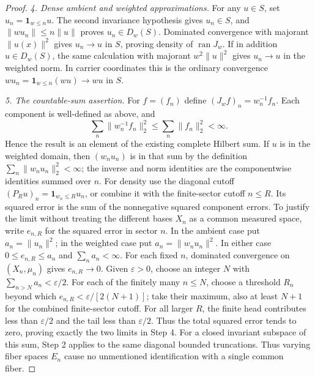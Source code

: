 \documentclass[11pt,a4paper]{article}
\theoremstyle{definition}
\theoremstyle{remark}
\begin{document}
\begin{proof}
\emph{4. Dense ambient and weighted approximations.}
For any $u\in S$, set $u_n=\mathbf1_{w\leq n}u$. The second
invariance hypothesis gives $u_n\in S$, and
$\|wu_n\|\leq n\|u\|$ proves $u_n\in D_w(S)$.
Dominated convergence with majorant $\|u(x)\|^2$ gives
$u_n\to u$ in $S$, proving density of $\operatorname{ran}J_w$.
If in addition $u\in D_w(S)$, the same calculation with majorant
$w^2\|u\|^2$ gives $u_n\to u$ in the weighted norm. In carrier
coordinates this is the ordinary convergence
$wu_n=\mathbf1_{w\leq n}(wu)\to wu$ in $S$.

\emph{5. The countable-sum assertion.}
For $f=(f_n)$ define $(J_wf)_n=w_n^{-1}f_n$. Each component is
well-defined as above, and
\[
 \sum_n\|w_n^{-1}f_n\|_2^2\leq\sum_n\|f_n\|_2^2<\infty.
\]
Hence the result is an element of the existing complete Hilbert
sum. If $u$ is in the weighted domain, then $(w_nu_n)$ is in that
sum by the definition $\sum_n\|w_nu_n\|_2^2<\infty$; the inverse
and norm identities are the componentwise identities summed over
$n$. For density use the diagonal cutoff
$(P_Ru)_n=\mathbf1_{w_n\leq R}u_n$, or combine it with the
finite-sector cutoff $n\leq R$. Its squared error is the sum of
the nonnegative squared component errors. To justify the limit
without treating the different bases $X_n$ as a common measured space,
write $e_{n,R}$ for the squared error in sector $n$. In the ambient
case put $a_n=\|u_n\|^2$; in the weighted case put
$a_n=\|w_nu_n\|^2$. In either case
$0\leq e_{n,R}\leq a_n$ and $\sum_n a_n<\infty$.
For each fixed $n$, dominated convergence on $(X_n,\mu_n)$
gives $e_{n,R}\to0$. Given $\varepsilon>0$, choose an integer
$N$ with $\sum_{n>N}a_n<\varepsilon/2$. For each of the
finitely many $n\leq N$, choose a threshold $R_n$ beyond which
$e_{n,R}<\varepsilon/[2(N+1)]$; take their maximum, also at
least $N+1$ for the combined finite-sector cutoff. For all larger
$R$, the finite head contributes less than $\varepsilon/2$
and the tail less than $\varepsilon/2$. Thus the total squared
error tends to zero, proving exactly the two limits in Step 4.
For a closed
invariant subspace of this sum, Step 2 applies to the same diagonal
bounded truncations. Thus varying fiber spaces $E_n$ cause no
unmentioned identification with a single common fiber.


\end{proof}
\end{document}
